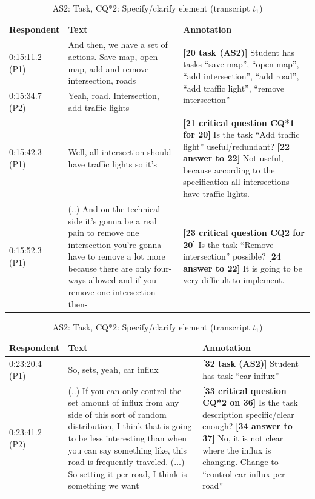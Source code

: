 \documentclass[11.5pt,two column]{llncs}
\begin{document}
\begin{table}[!htbp]
\begin{tabular}{|p{20mm}|p{70mm}|p{60mm}|}
\hline
Respondent & Text & Annotation\\
\hline
0:15:11.2 (P1) & And then, we have a set of actions. Save map, open map, add and remove intersection, roads & \multirow{2}{60mm}{\textbf{[20 task (AS2)]} Student has tasks ``save map'', ``open map'', ``add intersection'', ``add road'', ``add traffic light'', ``remove intersection''}\\
\cline{1-2}
0:15:34.7 (P2) & Yeah, road. Intersection, add traffic lights	&\\
\hline
0:15:42.3 (P1) & Well, all intersection should have traffic lights so it's & \textbf{[21 critical question CQ*1 for 20]} Is the task ``Add traffic light'' useful/redundant? \newline
\textbf{[22 answer to 22]} Not useful, because according to the specification all intersections have traffic lights.\\
\hline
0:15:52.3 (P1) & (..) And on the technical side it's gonna be a real pain to remove one intersection you're gonna have to remove a lot more because there are only four-ways allowed and if you remove one intersection then-& \textbf{[23 critical question CQ2 for 20]} Is the task ``Remove intersection'' possible?\newline
\textbf{[24 answer to 22]} It is going to be very difficult to implement.\\
\hline
\end{tabular}
\caption{AS2: Task, CQ*1: Redundant element, CQ2: impossible task (transcript $t_1$)}
\label{table:transcript:as2-cq_star_1-cq2}

\begin{tabular}{|p{20mm}|p{70mm}|p{60mm}|}
\hline
Respondent & Text & Annotation\\
\hline
0:23:20.4 (P1) & So, sets, yeah, car influx & \textbf{[32 task (AS2)]} Student has task ``car influx''\\
\hline
0:23:41.2 (P2) & (..) If you can only control the set amount of influx from any side of this sort of random distribution, I think that is going to be less interesting than when you can say something like, this road is frequently traveled. (...) So setting it per road, I think is something we want & \textbf{[33 critical question CQ*2 on 36]} Is the task description specific/clear enough? \newline
\textbf{[34 answer to 37]} No, it is not clear where the influx is changing. Change to ``control car influx per road''\\
\hline
\end{tabular}
\caption{AS2: Task, CQ*2: Specify/clarify element (transcript $t_1$)}
\label{table:transcript:as2-cq_star_2}


\end{table}
\end{document}
